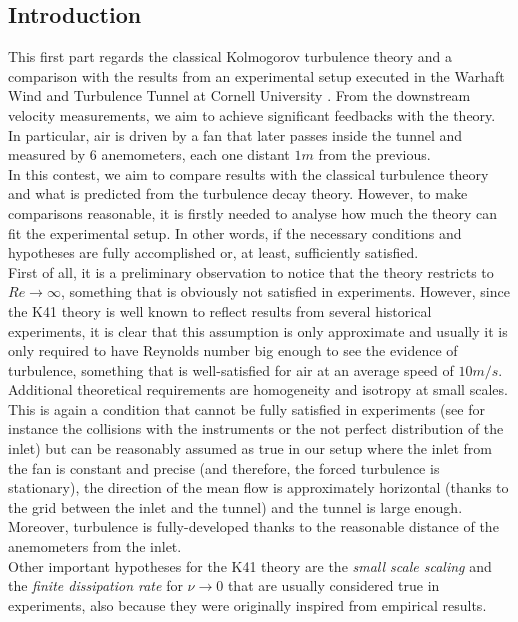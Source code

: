 \documentclass[11pt,titlepage]{article}
\begin{document}
\subsection{Introduction} %
This first part regards the classical Kolmogorov turbulence theory and a comparison with the results from an experimental setup executed in the Warhaft Wind and Turbulence Tunnel at Cornell University \cite{yoon_warhaft_1990}. From the downstream velocity measurements, we aim to achieve significant feedbacks with the theory. In particular, air is driven by a fan that later passes inside the tunnel and measured by 6 anemometers, each one distant $1m$ from the previous. \\
In this contest, we aim to compare results with the classical turbulence theory and what is predicted from the turbulence decay theory. However, to make comparisons reasonable, it is firstly needed to analyse how much the theory can fit the experimental setup.  In other words, if the necessary conditions and hypotheses are fully accomplished or, at least, sufficiently satisfied. \\
First of all, it is a preliminary observation to notice that the theory restricts to $Re\rightarrow \infty$, something that is obviously not satisfied in experiments. However, since the K41 theory is well known to reflect results from several historical experiments, it is clear that this assumption is only approximate and usually it is only required to have Reynolds number big enough to see the evidence of turbulence, something that is well-satisfied for air at an average speed of $10m/s$. \\
Additional theoretical requirements are homogeneity and isotropy at small scales. This is again a condition that cannot be fully satisfied in experiments (see for instance the collisions with the instruments or the not perfect distribution of the inlet) but can be reasonably assumed as true in our setup where the inlet from the fan is constant and precise (and therefore, the forced turbulence is stationary), the direction of the mean flow is approximately horizontal (thanks to the grid between the inlet and the tunnel) and the tunnel is large enough. Moreover, turbulence is fully-developed thanks to the reasonable distance of the anemometers from the inlet.\\
Other important hypotheses for the K41 theory are the \emph{small scale scaling} and the \emph{finite dissipation rate} for $\nu \rightarrow 0$ that are usually considered true in experiments, also because they were originally inspired from empirical results. \\ 
\end{document}
